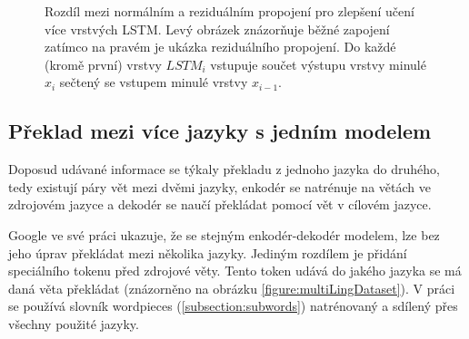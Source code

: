 \begin{figure}[H]
    \begin{center}
    \end{center}
	\caption{Rozdíl mezi normálním a reziduálním propojení pro zlepšení učení více vrstvých LSTM. Levý obrázek znázorňuje běžné zapojení zatímco na pravém je ukázka reziduálního propojení. Do každé (kromě první) vrstvy $LSTM_i$ vstupuje součet výstupu vrstvy minulé $x_i$ sečtený se vstupem minulé vrstvy $x_{i-1}$.}
	\label{img:residuals}
\end{figure}


\subsection{Překlad mezi více jazyky s jedním modelem} \label{section:multilingual}
Doposud udávané informace se týkaly překladu z jednoho jazyka do druhého, tedy existují páry vět mezi dvěmi jazyky, enkodér se natrénuje na větách ve zdrojovém jazyce a dekodér se naučí překládat pomocí vět v cílovém jazyce.

Google ve své práci \cite{googleMultiLingual} ukazuje, že se stejným enkodér-dekodér modelem, lze bez jeho úprav překládat mezi několika jazyky.
Jediným rozdílem je přidání speciálního tokenu před zdrojové věty. Tento token udává do jakého jazyka se má daná věta překládat (znázorněno na obrázku \ref{figure:multiLingDataset}). V práci se používá slovník wordpieces (\ref{subsection:subwords}) natrénovaný a sdílený přes všechny použité jazyky.


